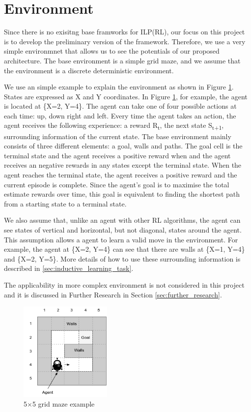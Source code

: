 \section{Environment}
\label{sec:environment}
Since there is no exisitng base framworks for ILP(RL), our focus on this project is to develop the preliminary version of the framework. 
Therefore, we use a very simple environmnet that allows us to see the potentials of our proposed architecture.
The base environment is a simple grid maze, and we assume that the environment is a discrete deterministic environment. 

We use an simple example to explain the environment as shown in Figure \ref{environment_example}.
States are expressed as X and Y coordinates. In Figure \ref{environment_example}, for example, the agent is located at \{X=2, Y=4\}.
The agent can take one of four possible actions at each time: up, down right and left.
Every time the agent takes an action, the agent receives the following experience: a reward R\textsubscript{t}, the next state S\textsubscript{t+1}, surrounding information of the current state.
The base environment mainly consists of three different elements: a goal, walls and paths.
The goal cell is the terminal state and the agent receives a positive reward when and the agent receives an negative rewards in any states except the terminal state.
When the agent reaches the terminal state, the agent receives a positive reward and the current episode is complete. 
Since the agent's goal is to maximise the total estimate rewards over time, this goal is equivalent to finding the shortest path from a starting state to a terminal state.

We also assume that, unlike an agent with other RL algorithms, the agent can see states of vertical and horizontal, but not diagonal, states around the agent. 
This assumption allows a agent to learn a valid move in the environment. For example, the agent at \{X=2, Y=4\} can see that there are walls at \{X=1, Y=4\} and \{X=2, Y=5\}.
More details of how to use these surrounding information is described in \ref{sec:inductive_learning_task}.

The applicability in more complex environment is not considered in this project and it is discussed in Further Research in Section \ref{sec:further_research}.

\begin{figure}[!htb]
\centering
\includegraphics[width=0.4\textwidth]{./figures/environment_example}
\caption{5$\times$5 grid maze example}
\label{environment_example}
\end{figure}

